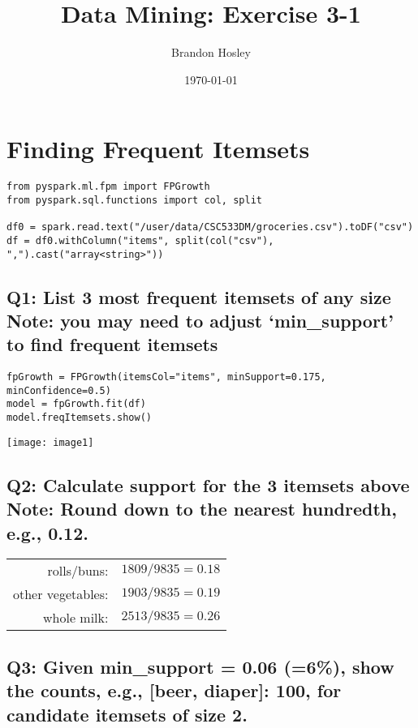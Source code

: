 \documentclass[]{article}
\title{Data Mining: Exercise 3-1}
\author{Brandon Hosley}
\date{\today}
\begin{document}
\maketitle

\section*{Finding Frequent Itemsets}

\begin{verbatim}
from pyspark.ml.fpm import FPGrowth
from pyspark.sql.functions import col, split

df0 = spark.read.text("/user/data/CSC533DM/groceries.csv").toDF("csv")
df = df0.withColumn("items", split(col("csv"), ",").cast("array<string>"))
\end{verbatim}

\subsection*{Q1: List 3 most frequent itemsets of any size \\ Note: you may need to adjust ‘min\_support’ to find frequent itemsets}

\begin{verbatim}
fpGrowth = FPGrowth(itemsCol="items", minSupport=0.175, minConfidence=0.5)
model = fpGrowth.fit(df)
model.freqItemsets.show()
\end{verbatim}

\texttt{[image: image1]}

\subsection*{Q2: Calculate support for the 3 itemsets above \\ Note: Round down to the nearest hundredth, e.g., 0.12.}

\begin{tabular}{r | l}
	rolls/buns:		& $ 1809 / 9835 = 0.18 $ \\
	other vegetables: & $ 1903 / 9835 = 0.19 $ \\
	whole milk:		& $ 2513 / 9835 = 0.26 $ \\
\end{tabular}

\subsection*{Q3: Given min\_support = 0.06 (=6\%), show the counts, e.g., [beer, diaper]: 100, for candidate itemsets of size 2. }
\end{document}
